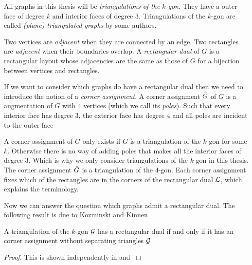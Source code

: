   All graphs in this thesis will be \emph{triangulations of the $k$-gon}. They have a outer face of degree $k$ and interior faces of degree $3$.
  Triangulations of the $k$-gon are called \emph{(plane) triangulated graphs} by some authors.

  Two vertices are \emph{adjacent} when they are connected by an edge. Two rectangles are \emph{adjacent} when their boundaries overlap. A \emph{rectangular dual} of $G$ is a rectangular layout whose adjacencies are the same as those of $G$ for a bijection between vertices and rectangles.

  If we want to consider which graphs do have a rectangular dual then we need to introduce the notion of a \emph{corner assignment}.
  A corner assignment $\bar{G}$ of $G$ is a augmentation of $G$ with $4$ vertices (which we call its \emph{poles}). Such that every interior face has degree $3$, the exterior face has degree $4$ and all poles are incident to the outer face

  A corner assignment of $G$ only exists if $G$ is a triangulation of the $k$-gon for some $k$. Otherwise there is no way of adding poles that makes all the interior faces of degree $3$. Which is why we only consider triangulations of the $k$-gon in this thesis. The corner assignment $\bar{G}$ is a triangulation of the $4$-gon. Each corner assignment fixes which of the rectangles are in the corners of the rectangular dual $\mathcal{L}$, which explains the terminology.


  Now we can answer the question which graphs admit a rectangular dual. The following result is due to Kozminski and Kinnen

  \begin{thrm}
    \label{th:rect:exsitenceREctangularDual}
    A triangulation of the $k$-gon $\mathcal{G}$ has a rectangular dual if and only if it has an corner assignment without separating triangles $\bar{\mathcal{G}}$
  \end{thrm}

  \begin{proof}
    This is shown independently in \cite{Kozminski1984} and  \cite{Ungar1953}
  \end{proof}

